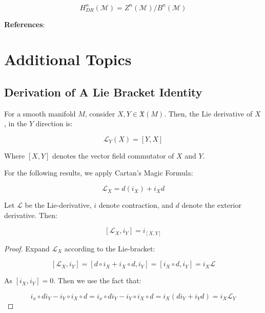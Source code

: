 \[
H_{DR}^{n}(\mathcal{M}) = Z^{n}(\mathcal{M})/B^{n}(\mathcal{M})
\]

\noindent \textbf{References}: \textcite{Isham:1999rh}

\section{Additional Topics}

\subsection{Derivation of A Lie Bracket Identity}

\begin{defn}
For a smooth manifold $M$, consider $X, Y \in \mathfrak{X}(M)$. Then, the Lie derivative of $X$, in the $Y$ direction is:

$$\mathcal{L}_{Y}(X) = [Y,X]$$

\noindent Where $[X, Y]$ denotes the vector field commutator of $X$ and $Y$.  
\end{defn}

\noindent For the following results, we apply Cartan's Magic Formula:

\begin{theorem}

$$\mathcal{L}_{X} = d(i_{X}) + i_{X} d$$

\end{theorem}

\begin{lemma}

Let $\mathcal{L}$ be the Lie-derivative, $i$ denote contraction, and $d$ denote the exterior derivative. Then:

\label{FundamentalContracIdentity}
$$[\mathcal{L}_{X}, i_{Y}] = i_{[X, Y]}$$
\end{lemma}

\begin{proof}
Expand $\mathcal{L}_{X}$ according to the Lie-bracket: 

$$[\mathcal{L}_{X}, i_{Y}] = [d \circ i_{X}  + i_{X} \circ d, i_{Y}] = [i_{X} \circ d, i_{Y}] = i_{X} \mathcal{L}$$

\noindent As $[i_{X}, i_{Y}] = 0$. Then we use the fact that:

$$i_{x} \circ d i_{Y} - i_{Y} \circ i_{X} \circ d = i_{x} \circ d i_{Y} - i_{Y} \circ i_{X} \circ d = i_{X}( d i_{Y} + i_{Y} d) = i_{X} \mathcal{L}_{Y}$$
\end{proof}

